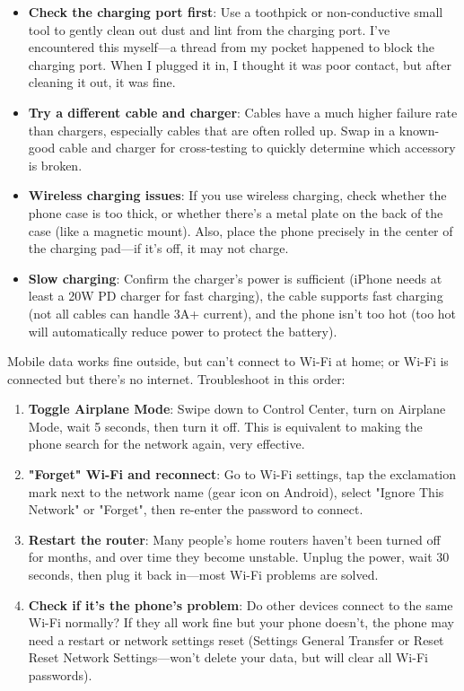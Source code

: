 \begin{itemize}
  \item \textbf{Check the charging port first}: Use a toothpick or non-conductive small tool to gently clean out dust and lint from the charging port. I've encountered this myself—a thread from my pocket happened to block the charging port. When I plugged it in, I thought it was poor contact, but after cleaning it out, it was fine.
  \item \textbf{Try a different cable and charger}: Cables have a much higher failure rate than chargers, especially cables that are often rolled up. Swap in a known-good cable and charger for cross-testing to quickly determine which accessory is broken.
  \item \textbf{Wireless charging issues}: If you use wireless charging, check whether the phone case is too thick, or whether there's a metal plate on the back of the case (like a magnetic mount). Also, place the phone precisely in the center of the charging pad—if it's off, it may not charge.
  \item \textbf{Slow charging}: Confirm the charger's power is sufficient (iPhone needs at least a 20W PD charger for fast charging), the cable supports fast charging (not all cables can handle 3A+ current), and the phone isn't too hot (too hot will automatically reduce power to protect the battery).
\end{itemize}


Mobile data works fine outside, but can't connect to Wi-Fi at home; or Wi-Fi is connected but there's no internet. Troubleshoot in this order:

\begin{enumerate}
  \item \textbf{Toggle Airplane Mode}: Swipe down to Control Center, turn on Airplane Mode, wait 5 seconds, then turn it off. This is equivalent to making the phone search for the network again, very effective.
  \item \textbf{"Forget" Wi-Fi and reconnect}: Go to Wi-Fi settings, tap the exclamation mark next to the network name (gear icon on Android), select "Ignore This Network" or "Forget", then re-enter the password to connect.
  \item \textbf{Restart the router}: Many people's home routers haven't been turned off for months, and over time they become unstable. Unplug the power, wait 30 seconds, then plug it back in—most Wi-Fi problems are solved.
  \item \textbf{Check if it's the phone's problem}: Do other devices connect to the same Wi-Fi normally? If they all work fine but your phone doesn't, the phone may need a restart or network settings reset (Settings General Transfer or Reset Reset Network Settings—won't delete your data, but will clear all Wi-Fi passwords).
\end{enumerate}

